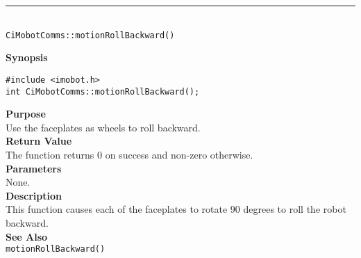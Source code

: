 \noindent
\vspace{5pt}
\rule{4.5in}{0.015in}\\
\noindent
{\LARGE \texttt{CiMobotComms::motionRollBackward()}}\\
{}

\noindent
{\bf Synopsis}\\
\begin{verbatim}
#include <imobot.h>
int CiMobotComms::motionRollBackward();
\end{verbatim}

\noindent
{\bf Purpose}\\
Use the faceplates as wheels to roll backward.\\

\noindent
{\bf Return Value}\\
The function returns 0 on success and non-zero otherwise.\\

\noindent
{\bf Parameters}\\
None.\\

\noindent
{\bf Description}\\
This function causes each of the faceplates to rotate 90 degrees to roll the
robot backward.\\

\noindent
{\bf See Also}\\
\texttt{motionRollBackward()}

